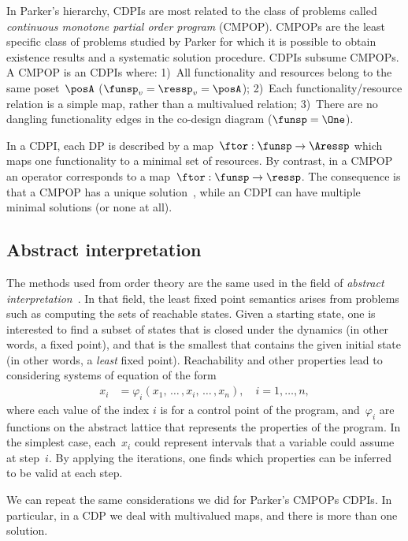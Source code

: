 In Parker's hierarchy, CDPIs are most related to the class of problems called \emph{continuous monotone partial order program} (CMPOP).
CMPOPs are the least specific class of problems studied by Parker for which it is possible to obtain existence results and a systematic solution procedure.
CDPIs subsume CMPOPs.
A CMPOP is an CDPIs where: 1)~All functionality and resources belong to the same poset~$\posA$ ($\funsp_{v}=\ressp_{v}=\posA$);
2)~Each functionality/resource relation is a simple map, rather than a multivalued relation; 3)~There are no dangling functionality edges in the co-design diagram ($\funsp=\One$).

In a CDPI, each DP is described by a \scottcontinuous map~$\ftor:\funsp\rightarrow\Aressp$ which maps one functionality to a minimal set of resources.
By contrast, in a CMPOP an operator corresponds to a \scottcontinuous map~$\ftor:\funsp\rightarrow\ressp$.
The consequence is that a CMPOP has a unique solution~\cite[Theorem 8]{parkerjr89partial},
while an CDPI can have multiple minimal solutions (or none at all).
\subsection{Abstract interpretation}

The methods used from order theory are the same used in the field of \emph{abstract interpretation}~\cite{cousot14abstract}.
In that field, the least fixed point semantics arises from problems such as computing the sets of reachable states.
Given a starting state,
one is interested to find a subset of states that is closed under the dynamics (in other words, a fixed point), and that is the smallest that contains the given initial state (in other words, a \emph{least} fixed point).
Reachability and other properties lead to considering systems of equation of the form
\begin{align}
    x_{i} & =\varphi_{i}(x_{1},\,\dots\,,x_{i},\,\dots\,,x_{n}),\quad i=1,\dots,n,\label{eq:ai}
\end{align}
where each value of the index $i$ is for a control point of the program, and~$\varphi_{i}$ are \scottcontinuous functions on the abstract lattice that represents the properties of the program.
In the simplest case, each~$x_{i}$ could represent intervals that a variable could assume at step~$i$.
By applying the iterations, one finds which properties can be inferred to be valid at each step.

We can repeat the same considerations we did for Parker's CMPOPs \vs CDPIs.
In particular, in a CDP we deal with multivalued maps, and there is more than one solution.

